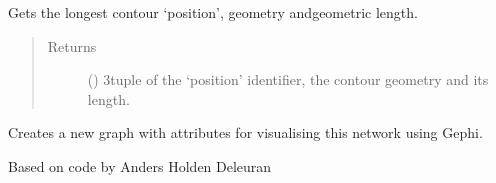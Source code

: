 \documentclass[letterpaper,10pt,english]{sphinxmanual}
\begin{document}
\begin{fulllineitems}
\begin{fulllineitems}
\begin{quote}
\begin{description}
\end{description}\end{quote}

\end{fulllineitems}


\begin{fulllineitems}
\label{\detokenize{cockatoo:cockatoo.KnitNetworkBase.longest_position_contour}}
Gets the longest contour ‘position’, geometry andgeometric length.
\begin{quote}\begin{description}
\item[{Returns}] \leavevmode
{} () \textendash{} 3\sphinxhyphen{}tuple of the ‘position’ identifier, the contour geometry and its
length.

\end{description}\end{quote}

\end{fulllineitems}


\begin{fulllineitems}
\label{\detokenize{cockatoo:cockatoo.KnitNetworkBase.make_gephi_graph}}
Creates a new graph with attributes for visualising this network
using Gephi.

Based on code by Anders Holden Deleuran

\end{fulllineitems}



\end{fulllineitems}
\end{document}
